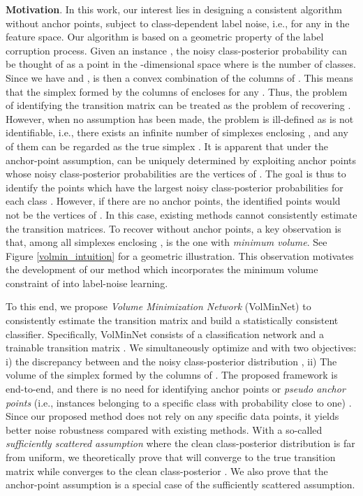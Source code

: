 \documentclass{article}
\begin{document}
{\bf{Motivation}}. In this work, our interest lies in designing a consistent algorithm without anchor points, subject to class-dependent label noise, i.e.,  for any  in the feature space. Our algorithm is based on a geometric property of the label corruption process. Given an instance , the noisy class-posterior probability   can be thought of as a point in the -dimensional space where  is the number of classes. Since we have  and ,  is then a convex combination of the columns of . This means that the simplex  formed by the columns of  encloses  for any  \cite{boyd2004convex}. Thus, the problem of identifying the transition matrix can be treated as the problem of recovering . However, when no assumption has been made, the problem is ill-defined as  is not identifiable, i.e., there exists an infinite number of simplexes enclosing , and any of them can be regarded as the true simplex . It is apparent that under the anchor-point assumption,  can be uniquely determined by exploiting anchor points whose noisy class-posterior probabilities are the vertices of . The goal is thus to identify the points which have the largest noisy class-posterior probabilities for each class \cite{liu2016classification, patrini2017making}. However, if there are no anchor points, the identified points would not be the vertices of . In this case, existing methods cannot consistently estimate the transition matrices. To recover  without anchor points, a key observation is that, among all simplexes enclosing ,  is the one with \emph{minimum volume}. See Figure \ref{volmin_intuition} for a geometric illustration. This observation motivates the development of our method which incorporates the minimum volume constraint of  into label-noise learning.


To this end, we propose \textit{Volume Minimization Network} (VolMinNet) to consistently estimate the transition matrix and build a statistically consistent classifier. Specifically, VolMinNet consists of a classification network  and a trainable transition matrix .  We simultaneously optimize  and  with two objectives: i) the discrepancy between  and the noisy class-posterior distribution , ii) The volume of the simplex formed by the columns of . The proposed framework is end-to-end, and there is no need for identifying anchor points or \emph{pseudo anchor points} (i.e., instances belonging to a specific class with probability close to one) \cite{xia2019anchor}. Since our proposed method does not rely on any specific data points, it yields better noise robustness compared with existing methods. With a so-called \emph{sufficiently scattered assumption} where the clean class-posterior distribution is far from uniform, we theoretically prove that  will converge to the true transition matrix  while  converges to the clean class-posterior . We also prove that the anchor-point assumption is a special case of the sufficiently scattered assumption. 
\end{document}
